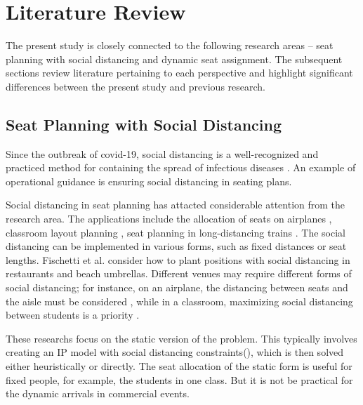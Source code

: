 \section{Literature Review}

The present study is closely connected to the following research areas -- seat planning with social distancing and dynamic seat assignment. The subsequent sections review literature pertaining to each perspective and highlight significant differences between the present study and previous research.


\subsection{Seat Planning with Social Distancing}
Since the outbreak of covid-19, social distancing is a well-recognized and practiced method for containing the spread of infectious diseases \cite{moosa2020effectiveness}. An example of operational guidance is ensuring social distancing in seating plans.

Social distancing in seat planning has attacted considerable attention from the research area. The applications include the allocation of seats on airplanes \cite{ghorbani2020model}, classroom layout planning \cite{bortolete2022support}, seat planning in long-distancing trains \cite{haque2022optimization}. The social distancing can be implemented in various forms, such as fixed distances or seat lengths. Fischetti et al.\cite{fischetti2021safe} consider how to plant positions with social distancing in restaurants and beach umbrellas. Different venues may require different forms of social distancing; for instance, on an airplane, the distancing between seats and the aisle must be considered \cite{salari2022social}, while in a classroom, maximizing social distancing between students is a priority \cite{bortolete2022support}.

These researchs focus on the static version of the problem. This typically involves creating an IP model with social distancing constraints(\cite{bortolete2022support, ghorbani2020model, haque2022optimization}), which is then solved either heuristically or directly. The seat allocation of the static form is useful for fixed people, for example, the students in one class. But it is not be practical for the dynamic arrivals in commercial events.




